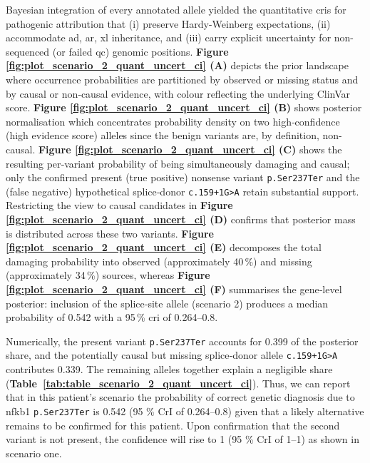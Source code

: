 Bayesian integration of every annotated allele yielded the quantitative \ac{cri}s for pathogenic attribution that (i) preserve Hardy-Weinberg expectations, (ii) accommodate \ac{ad}, \ac{ar}, \ac{xl} inheritance, and (iii) carry explicit uncertainty for non-sequenced (or failed \ac{qc}) genomic positions.  
\textbf{Figure \ref{fig:plot_scenario_2_quant_uncert_ci} (A)}
depicts the prior landscape where occurrence probabilities are partitioned by observed or missing status and by causal or non‑causal evidence, with colour reflecting the underlying ClinVar score.  
\textbf{Figure \ref{fig:plot_scenario_2_quant_uncert_ci} (B)} shows posterior normalisation which concentrates probability density on two high‑confidence (high evidence score) alleles since the benign variants are, by definition, non-causal.
\textbf{Figure \ref{fig:plot_scenario_2_quant_uncert_ci} (C)} shows the resulting per‑variant probability of being simultaneously damaging and causal; only the confirmed present (true positive) nonsense variant \texttt{p.Ser237Ter} and the (false negative) hypothetical splice‑donor \texttt{c.159+1G{\small\textgreater}A} retain substantial support. 
Restricting the view to causal candidates in 
\textbf{Figure \ref{fig:plot_scenario_2_quant_uncert_ci} (D)} 
confirms that posterior mass is distributed across these two variants. 
\textbf{Figure \ref{fig:plot_scenario_2_quant_uncert_ci} (E)} decomposes the total damaging probability into observed (approximately 40\,\%) and missing (approximately 34\,\%) sources, whereas \textbf{Figure \ref{fig:plot_scenario_2_quant_uncert_ci} (F)} summarises the gene‑level posterior: inclusion of the splice‑site allele (scenario 2) produces a median probability of 0.542 with a 95\,\% \ac{cri} of 0.264–0.8. 

Numerically, the present variant \texttt{p.Ser237Ter} accounts for 0.399 of the posterior share, and the potentially causal but missing splice‑donor allele \texttt{c.159+1G{\small\textgreater}A} contributes 0.339. The remaining alleles together explain a negligible share (\textbf{Table~\ref{tab:table_scenario_2_quant_uncert_ci}}).
Thus, we can report that in this patient's scenario the probability of correct genetic diagnosis due to \ac{nfkb1} \texttt{p.Ser237Ter} is 0.542 (95 \% CrI of 0.264–0.8) given that a likely alternative remains to be confirmed for this patient.
Upon confirmation that the second variant is not present, the confidence will rise to 1 (95 \% CrI of  1–1)  as shown in scenario one.



